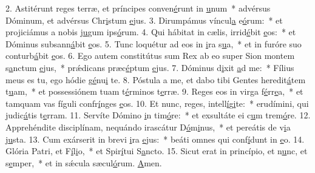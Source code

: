 2. Astitérunt reges terræ, et príncipes conven\uline{é}runt in \uline{u}num~* advérsus Dóminum, et advérsus Chr\uline{i}stum \uline{e}jus.
3. Dirumpámus víncul\uline{a} e\uline{ó}rum:~* et projiciámus a nobis j\uline{u}gum ips\uline{ó}rum.
4. Qui hábitat in cælis, irrid\uline{é}bit \uline{e}os:~* et Dóminus subsann\uline{á}bit \uline{e}os.
5. Tunc loquétur ad eos in \uline{i}ra s\uline{u}a,~* et in furóre suo conturb\uline{á}bit \uline{e}os.
6. Ego autem constitútus sum Rex ab eo super Sion montem s\uline{a}nctum \uline{e}jus,~* prǽdicans præc\uline{é}ptum \uline{e}jus.
7. Dóminus d\uline{i}xit \uline{a}d me:~* Fílius meus es tu, ego hódie g\uline{é}nu\uline{i} te.
8. Póstula a me, et dabo tibi Gentes heredit\uline{á}tem t\uline{u}am,~* et possessiónem tuam t\uline{é}rminos t\uline{e}rræ.
9. Reges eos in virga f\uline{é}rr\uline{e}a,~* et tamquam vas fíguli confr\uline{í}nges \uline{e}os.
10. Et nunc, reges, intell\uline{í}g\uline{i}te:~* erudímini, qui judic\uline{á}tis t\uline{e}rram.
11. Servíte Dómino \uline{i}n tim\uline{ó}re:~* et exsultáte ei c\uline{u}m trem\uline{ó}re.
12. Apprehéndite disciplínam, nequándo irascátur D\uline{ó}m\uline{i}nus,~* et pereátis de v\uline{i}a j\uline{u}sta.
13. Cum exárserit in brevi \uline{i}ra \uline{e}jus:~* beáti omnes qui conf\uline{í}dunt in \uline{e}o.
14. Glória Patri, et F\uline{í}l\uline{i}o,~* et Spir\uline{í}tui S\uline{a}ncto.
15. Sicut erat in princípio, et n\uline{u}nc, et s\uline{e}mper,~* et in sǽcula sæcul\uline{ó}rum. \uline{A}men.

